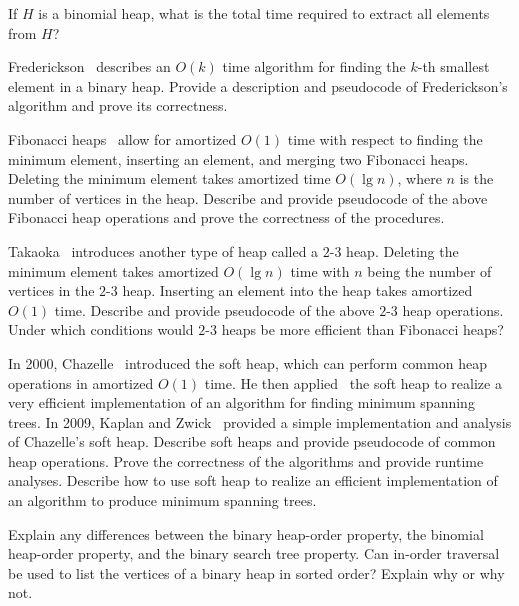 \begin{problem}
\item If $H$ is a binomial heap, what is the
  total time required to extract all elements from $H$?

\item Frederickson~\cite{Frederickson1993}
  describes an $O(k)$ time algorithm for finding the $k$-th smallest
  element in a binary heap. Provide a description and pseudocode of
  Frederickson's algorithm and prove its correctness.

\item Fibonacci heaps~\cite{FredmanTarjan1984} allow for amortized
  $O(1)$ time with respect to finding the minimum element,
  inserting an element, and merging two Fibonacci heaps. Deleting the
  minimum element takes amortized time $O(\lg n)$, where $n$ is the
  number of vertices in the heap. Describe and provide pseudocode of
  the above Fibonacci heap operations and prove the correctness of the
  procedures.

\item Takaoka~\cite{Takaoka1999a} introduces
  another type of heap called a $2$-$3$ heap. Deleting the minimum
  element takes amortized $O(\lg n)$ time with $n$ being the number of
  vertices in the $2$-$3$ heap. Inserting an element into the heap
  takes amortized $O(1)$ time. Describe and provide pseudocode of the
  above $2$-$3$ heap operations. Under which conditions would $2$-$3$
  heaps be more efficient than Fibonacci heaps?

\item In 2000, Chazelle~\cite{Chazelle2000a}
  introduced the soft heap, which can perform common heap operations
  in amortized $O(1)$ time. He then applied~\cite{Chazelle2000b} the
  soft heap to realize a very efficient implementation of an algorithm
  for finding minimum spanning trees. In 2009,
  Kaplan and
  Zwick~\cite{KaplanZwick2009} provided a simple
  implementation and analysis of Chazelle's soft heap. Describe soft
  heaps and provide pseudocode of common heap operations. Prove the
  correctness of the algorithms and provide runtime analyses. Describe
  how to use soft heap to realize an efficient implementation of an
  algorithm to produce minimum spanning trees.

\item Explain any differences between the binary
  heap-order property, the
  binomial heap-order
  property, and the binary
  search tree property. Can
  in-order traversal be used to list the vertices of a binary heap in
  sorted order? Explain why or why not.


\end{problem}
